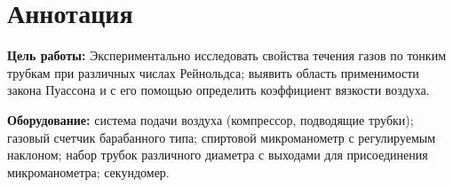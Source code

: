 \section{Аннотация}
\textbf{Цель работы:} Экспериментально исследовать свойства течения газов по тонким трубкам
при различных числах  Рейнольдса; выявить область применимости закона Пуассона и с его
помощью определить коэффициент вязкости воздуха.

\textbf{Оборудование:} система подачи воздуха (компрессор, подводящие трубки);
газовый счетчик барабанного типа; спиртовой микроманометр с регулируемым
наклоном; набор трубок различного диаметра с выходами для присоединения
микроманометра; секундомер.